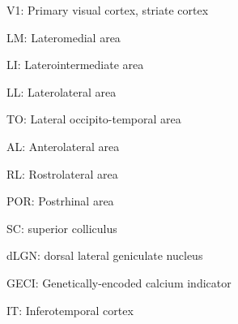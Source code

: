 
\noindent V1: Primary visual cortex, striate cortex

\vspace{0.1in}
\noindent LM: Lateromedial area

\vspace{0.1in}
\noindent LI: Laterointermediate area

\vspace{0.1in}
\noindent LL: Laterolateral area

\vspace{0.1in}
\noindent TO: Lateral occipito-temporal area

\vspace{0.1in}
\noindent AL: Anterolateral area

\vspace{0.1in}
\noindent RL: Rostrolateral area

\vspace{0.1in}
\noindent POR: Postrhinal area

\vspace{0.1in}
\noindent SC: superior colliculus

\vspace{0.1in}
\noindent dLGN: dorsal lateral geniculate nucleus

\vspace{0.1in}
\noindent GECI: Genetically-encoded calcium indicator


\vspace{0.1in}
\noindent IT: Inferotemporal cortex

